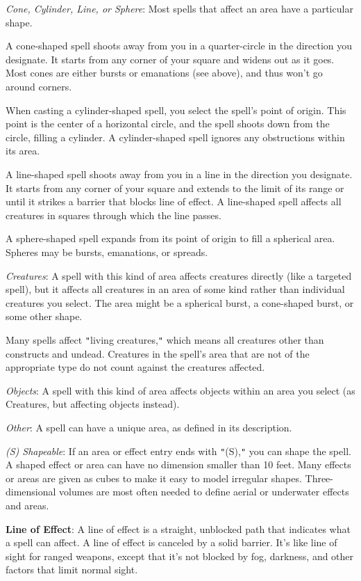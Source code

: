 \textit{Cone, Cylinder, Line, or Sphere}: Most spells that affect an area have a particular shape.
				
A cone-shaped spell shoots away from you in a quarter-circle in the direction you designate. It starts from any corner of your square and widens out as it goes. Most cones are either bursts or emanations (see above), and thus won't go around corners.
				
When casting a cylinder-shaped spell, you select the spell's point of origin. This point is the center of a horizontal circle, and the spell shoots down from the circle, filling a cylinder. A cylinder-shaped spell ignores any obstructions within its area.
				
A line-shaped spell shoots away from you in a line in the direction you designate. It starts from any corner of your square and extends to the limit of its range or until it strikes a barrier that blocks line of effect. A line-shaped spell affects all creatures in squares through which the line passes.
				
A sphere-shaped spell expands from its point of origin to fill a spherical area. Spheres may be bursts, emanations, or spreads.
				
\textit{Creatures}: A spell with this kind of area affects creatures directly (like a targeted spell), but it affects all creatures in an area of some kind rather than individual creatures you select. The area might be a spherical burst, a cone-shaped burst, or some other shape.
				
Many spells affect \texttt{{}"{}}living creatures,\texttt{{}"{}} which means all creatures other than constructs and undead. Creatures in the spell's area that are not of the appropriate type do not count against the creatures affected.
				
\textit{Objects}: A spell with this kind of area affects objects within an area you select (as Creatures, but affecting objects instead).
				
\textit{Other}: A spell can have a unique area, as defined in its description.
				
\textit{(S) Shapeable}: If an area or effect entry ends with \texttt{{}"{}}(S),\texttt{{}"{}} you can shape the spell. A shaped effect or area can have no dimension smaller than 10 feet. Many effects or areas are given as cubes to make it easy to model irregular shapes. Three-dimensional volumes are most often needed to define aerial or underwater effects and areas.
				
\textbf{Line of Effect}: A line of effect is a straight, unblocked path that indicates what a spell can affect. A line of effect is canceled by a solid barrier. It's like line of sight for ranged weapons, except that it's not blocked by fog, darkness, and other factors that limit normal sight.
				
